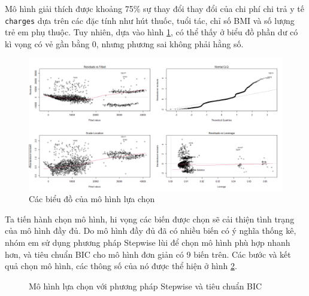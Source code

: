 Mô hình giải thích được khoảng 75\% sự thay đổi thay đổi của chi phí chi trả y tế \texttt{charges} dựa trên các đặc tính như hút thuốc, tuổi tác, chỉ số BMI và số lượng trẻ em phụ thuộc. Tuy nhiên, dựa vào hình \ref{fig-a1:model-full-plot}, có thể thấy ở biểu đồ phần dư có kì vọng có vẻ gần bằng 0, nhưng phương sai không phải hằng số.
\begin{figure}[H]
	\centering
	\includegraphics[width=0.8\linewidth]{images/A1/model-full-plot}
	\caption{Các biểu đồ của mô hình lựa chọn}
	\label{fig-a1:model-full-plot}
\end{figure}

Ta tiến hành chọn mô hình, hi vọng các biến được chọn sẽ cải thiện tình trạng của mô hình đầy đủ. Do mô hình đầy đủ đã có nhiều biến có ý nghĩa thống kê, nhóm em sử dụng phương pháp Stepwise lùi để chọn mô hình phù hợp nhanh hơn, và tiêu chuẩn BIC cho mô hình đơn giản có 9 biến trên. Các bước và kết quả chọn mô hình, các thông số của nó được thể hiện ở hình \ref{fig-a1:model-bic}.
\begin{figure}[H]
	\centering
	\hfill
	\caption{Mô hình lựa chọn với phương pháp Stepwise và tiêu chuẩn BIC}
	\label{fig-a1:model-bic}
\end{figure}


